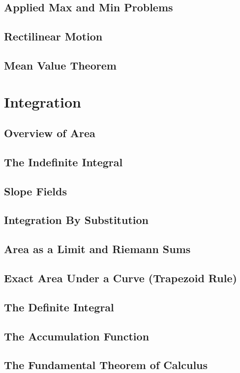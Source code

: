 \documentclass[letterpaper]{report}
\begin{document}
\section{Applied Max and Min Problems}
\section{Rectilinear Motion}
\section{Mean Value Theorem}

\chapter{Integration}
\section{Overview of Area}
\section{The Indefinite Integral}
\section{Slope Fields}
\section{Integration By Substitution}
\section{Area as a Limit and Riemann Sums}
\section{Exact Area Under a Curve (Trapezoid Rule)}
\section{The Definite Integral}
\section{The Accumulation Function}
\section{The Fundamental Theorem of Calculus}
\end{document}

